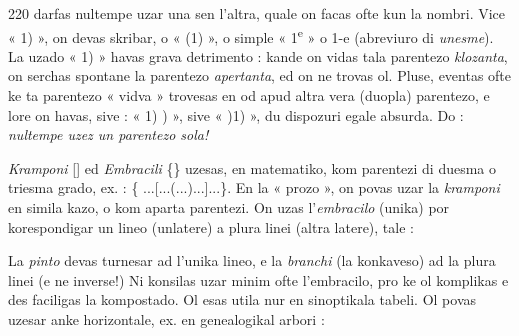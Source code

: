 \begin{VUpage}[224]{220}
\VUcontinue
darfas nultempe uzar una sen l'altra, quale on facas ofte\nl
kun la nombri. Vice « 1) », on devas skribar, o « (1) », o\nl
simple « 1\textsuperscript{e} » o 1-e (abreviuro di \textit{unesme}). La uzado « 1) »\nl
havas grava detrimento : kande on vidas tala parentezo\nl
\textit{klozanta}, on serchas spontane la parentezo \textit{apertanta}, ed on\nl
ne trovas ol. Pluse, eventas ofte ke ta parentezo « vidva »\nl
trovesas en od apud altra vera (duopla) parentezo, e lore\nl
on havas, sive : « 1) ) », sive « )1) », du dispozuri egale\nl
absurda. Do : \textit{nultempe uzez un parentezo sola!}

\textit{Kramponi} [] ed \textit{Embracili} \{\} uzesas, en matematiko, kom\nl
parentezi di duesma o triesma grado, ex. : \{ ...[...(...)...]...\}.\nl
En la « prozo », on povas uzar la \textit{kramponi} en simila kazo,\nl
o kom aparta parentezi. On uzas l'\textit{embracilo} (unika) por\nl
korespondigar un lineo (unlatere) a plura linei (altra\cc
latere), tale :

\VUtabloCentrita
\VUblanc{3.50mm}
\VUblanc{3.46mm}

La \textit{pinto} devas turnesar ad l'unika lineo, e la \textit{branchi} (la\nl
konkaveso) ad la plura linei (e ne inverse!) Ni konsilas\nl
uzar minim ofte l'embracilo, pro ke ol komplikas e des\cc
faciligas la kompostado. Ol esas utila nur en sinoptikala\nl
tabeli. Ol povas uzesar anke horizontale, ex. en genealogikal\nl
arbori :

\VUtabloCentrita
{}
\VUblanc{2.58mm}
\VUblanc{3.48mm}


\end{VUpage}
